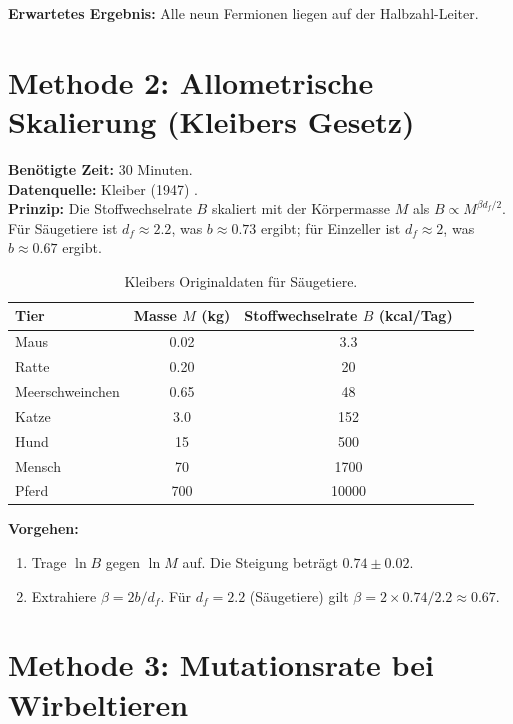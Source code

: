 \documentclass[12pt,a4paper]{article}
\begin{document}
	\textbf{Erwartetes Ergebnis:} Alle neun Fermionen liegen auf der Halbzahl-Leiter.
	
	\section{Methode 2: Allometrische Skalierung (Kleibers Gesetz)}
	\label{sec:kleiber}
	
	\textbf{Benötigte Zeit:} 30 Minuten.\\
	\textbf{Datenquelle:} Kleiber (1947) \cite{Kleiber1947}.\\
	\textbf{Prinzip:} Die Stoffwechselrate \(B\) skaliert mit der Körpermasse \(M\) als
	\(B \propto M^{\beta d_f/2}\). Für Säugetiere ist \(d_f \approx 2.2\), was
	\(b \approx 0.73\) ergibt; für Einzeller ist \(d_f \approx 2\), was
	\(b \approx 0.67\) ergibt.
	
	\begin{table}[H]
		\centering
		\caption{Kleibers Originaldaten für Säugetiere.}
		\label{tab:kleiber}
		\begin{tabular}{l c c c}
			\toprule
			Tier  & Masse \(M\) (kg) & Stoffwechselrate \(B\) (kcal/Tag) \\
			\midrule
			Maus        & 0.02   & 3.3 \\
			Ratte       & 0.20   & 20 \\
			Meerschweinchen & 0.65   & 48 \\
			Katze       & 3.0    & 152 \\
			Hund        & 15     & 500 \\
			Mensch      & 70     & 1700 \\
			Pferd       & 700    & 10000 \\
			\bottomrule
		\end{tabular}
	\end{table}
	
	\textbf{Vorgehen:}
	\begin{enumerate}[label=(\arabic*)]
		\item Trage \(\ln B\) gegen \(\ln M\) auf. Die Steigung beträgt \(0.74 \pm 0.02\).
		\item Extrahiere \(\beta = 2b / d_f\). Für \(d_f = 2.2\) (Säugetiere) gilt
		\(\beta = 2 \times 0.74 / 2.2 \approx 0.67\).
	\end{enumerate}
	
	\section{Methode 3: Mutationsrate bei Wirbeltieren}
	\label{sec:mutation}
	
\end{document}
